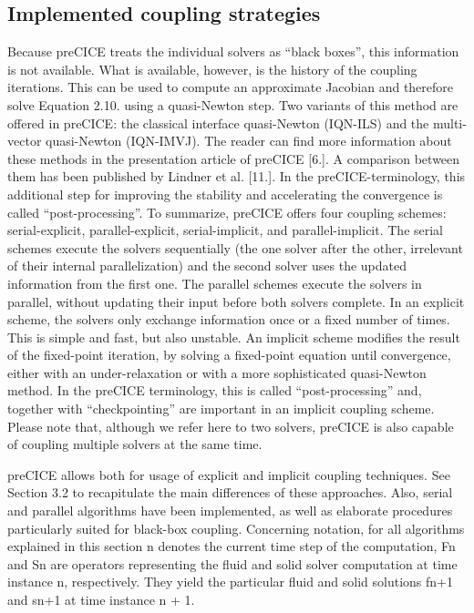 \subsection{Implemented coupling strategies}
\label{sec:pc-coupling}

Because preCICE treats the individual solvers as
“black boxes”, this information is not available. What is available, however, is the history
of the coupling iterations. This can be used to compute an approximate Jacobian and
therefore solve Equation 2.10. using a quasi-Newton step. Two variants of this method are
offered in preCICE: the classical interface quasi-Newton (IQN-ILS) and the multi-vector
quasi-Newton (IQN-IMVJ). The reader can find more information about these methods in
the presentation article of preCICE [6.]. A comparison between them has been published
by Lindner et al. [11.]. In the preCICE-terminology, this additional step for improving the
stability and accelerating the convergence is called “post-processing”.
To summarize, preCICE offers four coupling schemes: serial-explicit, parallel-explicit,
serial-implicit, and parallel-implicit. The serial schemes execute the solvers sequentially (the
one solver after the other, irrelevant of their internal parallelization) and the second solver
uses the updated information from the first one. The parallel schemes execute the solvers in
parallel, without updating their input before both solvers complete. In an explicit scheme,
the solvers only exchange information once or a fixed number of times. This is simple and
fast, but also unstable. An implicit scheme modifies the result of the fixed-point iteration,
by solving a fixed-point equation until convergence, either with an under-relaxation or with
a more sophisticated quasi-Newton method. In the preCICE terminology, this is called
“post-processing” and, together with “checkpointing” are important in an implicit coupling
scheme. Please note that, although we refer here to two solvers, preCICE is also capable of
coupling multiple solvers at the same time.



preCICE allows both for usage of explicit and implicit coupling techniques. See Section 3.2 to recapitulate
the main differences of these approaches. Also, serial and parallel algorithms have been implemented, as
well as elaborate procedures particularly suited for black-box coupling.
Concerning notation, for all algorithms explained in this section n denotes the current time step of
the computation, Fn and Sn are operators representing the fluid and solid solver computation at time
instance n, respectively. They yield the particular fluid and solid solutions fn+1 and sn+1 at time instance
n + 1.

